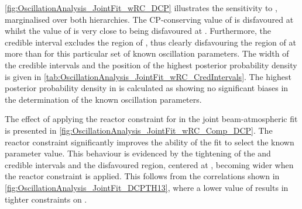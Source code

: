 \autoref{fig:OscillationAnalysis_JointFit_wRC_DCP} illustrates the sensitivity to , marginalised over both hierarchies. The CP-conserving value of  is disfavoured at \quickmath{2\sigma} whilst the value of  is very close to being disfavoured at \quickmath{2\sigma}. Furthermore, the \quickmath{3\sigma} credible interval excludes the region of , thus clearly disfavouring the region of  at more than \quickmath{3\sigma} for this particular set of known oscillation parameters. The width of the \quickmath{1\sigma} credible intervals and the position of the highest posterior probability density is given in \autoref{tab:OscillationAnalysis_JointFit_wRC_CredIntervals}. The highest posterior probability density in  is calculated as  showing no significant biases in the determination of the known oscillation parameters.

The effect of applying the reactor constraint for  in the joint beam-atmospheric fit is presented in \autoref{fig:OscillationAnalysis_JointFit_wRC_Comp_DCP}. The reactor constraint significantly improves the ability of the fit to select the known parameter value. This behaviour is evidenced by the tightening of the \quickmath{1\sigma} and  credible intervals and the disfavoured region, centered at , becoming wider when the reactor constraint is applied. This follows from the correlations shown in \autoref{fig:OscillationAnalysis_JointFit_DCPTH13}, where a lower value of  results in tighter constraints on . 

